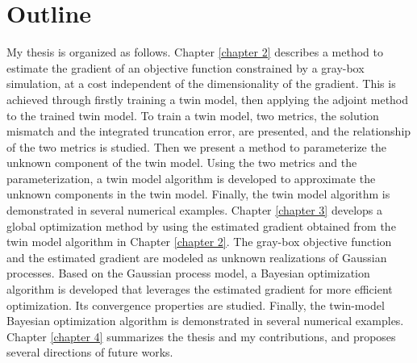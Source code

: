 \section{Outline}
My thesis is organized as follows. Chapter \ref{chapter 2}  describes a method to estimate the gradient of an
objective function constrained by a gray-box simulation, at a cost independent of the dimensionality
of the gradient. 
This is achieved through firstly training a twin model, then applying the adjoint method to the trained twin model.
To train a twin model, two metrics, the solution mismatch and the integrated truncation
error, are presented, and the relationship of the two metrics is studied.
Then we present a method to parameterize the unknown component of the twin model.
Using the two metrics and the parameterization, 
a twin model algorithm is developed to approximate the unknown 
components in the twin model.
Finally, the twin model algorithm is demonstrated in several numerical examples.
Chapter \ref{chapter 3} develops a global optimization method by using the estimated
gradient obtained from the twin model algorithm in Chapter \ref{chapter 2}.
The gray-box objective function and the estimated gradient are modeled as unknown
realizations of Gaussian processes.
Based on the Gaussian process model, 
a Bayesian optimization algorithm is developed that leverages the estimated gradient for
more efficient optimization.
Its convergence properties are studied. Finally, the twin-model Bayesian optimization algorithm
is demonstrated in several numerical examples. Chapter \ref{chapter 4} summarizes the thesis and
my contributions, and proposes several directions of future works.

